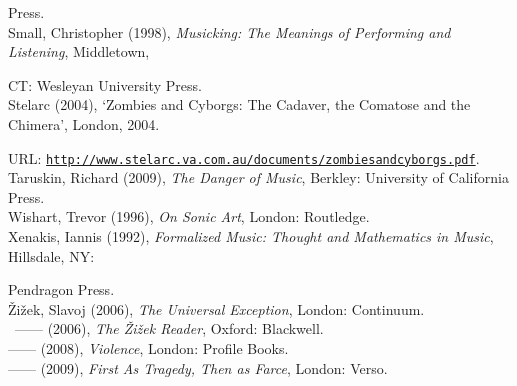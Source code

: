 Press. 
\hypertarget{small}{}\\
Small, Christopher (1998), \emph{Musicking: The Meanings of Performing and Listening}, Middletown, 

CT: Wesleyan University Press. 
\hypertarget{stelarc}{}\\
Stelarc (2004), `Zombies and Cyborgs: The Cadaver, the Comatose and the Chimera', London, 2004.

URL: \href{http://www.stelarc.va.com.au/documents/zombiesandcyborgs.pdf}{\texttt{http://www.stelarc.va.com.au/documents/zombiesandcyborgs.pdf}}.
\hypertarget{taruskin}{}\\
Taruskin, Richard (2009), \emph{The Danger of Music}, Berkley: University of California Press. 
\hypertarget{wishart}{}\\
Wishart, Trevor (1996), \emph{On Sonic Art}, London: Routledge. 
\hypertarget{xenakis}{}\\
Xenakis, Iannis (1992), \emph{Formalized Music: Thought and Mathematics in Music}, Hillsdale, NY: 

Pendragon Press. 
\hypertarget{zizekuniv}{}\\
\v{Z}i\v{z}ek, Slavoj (2006), \emph{The Universal Exception}, London: Continuum. 
\hypertarget{zizekreader}{}\\\
------ (2006), \emph{The \v{Z}i\v{z}ek Reader}, Oxford: Blackwell.
\hypertarget{zizekviolence}{}\\
------ (2008), \emph{Violence}, London: Profile Books. 
\hypertarget{zizektragedy}{}\\
------ (2009), \emph{First As Tragedy, Then as Farce}, London: Verso.\\
